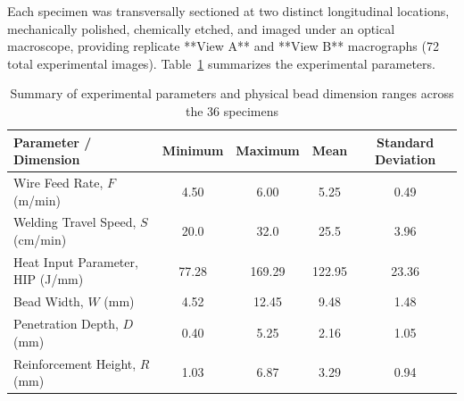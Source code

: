 \documentclass[12pt,a4paper,oneside]{report}
\begin{document}
Each specimen was transversally sectioned at two distinct longitudinal locations, mechanically polished, chemically etched, and imaged under an optical macroscope, providing replicate **View A** and **View B** macrographs (72 total experimental images). Table~\ref{tab:dataset_summary} summarizes the experimental parameters.

\begin{table}[htbp]\centering
\caption{Summary of experimental parameters and physical bead dimension ranges across the 36 specimens}\label{tab:dataset_summary}
\small
\begin{tabular}{@{}lcccc@{}}
\toprule
\textbf{Parameter / Dimension} & \textbf{Minimum} & \textbf{Maximum} & \textbf{Mean} & \textbf{Standard Deviation}\\ \midrule
Wire Feed Rate, $F$ (m/min)       & 4.50  & 6.00  & 5.25  & 0.49\\
Welding Travel Speed, $S$ (cm/min) & 20.0  & 32.0  & 25.5  & 3.96\\
Heat Input Parameter, HIP (J/mm)  & 77.28 & 169.29& 122.95& 23.36\\
Bead Width, $W$ (mm)              & 4.52  & 12.45 & 9.48  & 1.48\\
Penetration Depth, $D$ (mm)       & 0.40  & 5.25  & 2.16  & 1.05\\
Reinforcement Height, $R$ (mm)    & 1.03  & 6.87  & 3.29  & 0.94\\
\bottomrule
\end{tabular}
\end{table}
\end{document}
